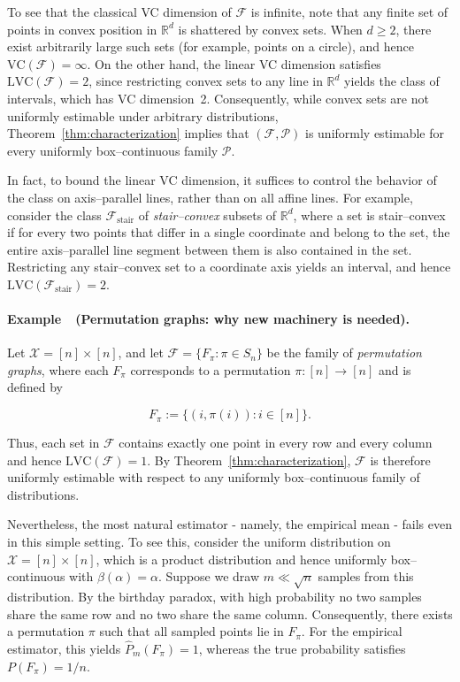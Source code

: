 \documentclass[arxiv]{colt2026}
\newcounter{examplectr}
\newcommand{\X}{\mathcal{X}}
\newcommand{\F}{\mathcal{F}}
\newcommand{\Pc}{\mathcal{P}}
\newcommand{\VC}{\mathrm{VC}}
\newcommand{\LVC}{\mathrm{LVC}}
\begin{document}
\vspace{-0.3em}
To see that the classical VC dimension of $\F$ is infinite, note that any finite set of points in convex position in $\mathbb{R}^d$ is shattered by convex sets.
When $d \ge 2$, there exist arbitrarily large such sets (for example, points on a circle), and hence $\VC(\F)=\infty$.
On the other hand, the linear VC dimension satisfies $\LVC(\F)=2$, since restricting convex sets to any line in $\mathbb{R}^d$ yields the class of intervals, which has VC dimension~2.
Consequently, while convex sets are not uniformly estimable under arbitrary distributions, Theorem~\ref{thm:characterization} implies that $(\F,\Pc)$ is uniformly estimable for every uniformly box--continuous family $\Pc$.

In fact, to bound the linear VC dimension, it suffices to control the behavior of the class on axis--parallel lines, rather than on all affine lines.
For example, consider the class $\F_{\mathrm{stair}}$ of \emph{stair--convex} subsets of $\mathbb{R}^d$, where a set is stair--convex if for every two points that differ in a single coordinate and belong to the set, the entire axis--parallel line segment between them is also contained in the set.
Restricting any stair--convex set to a coordinate axis yields an interval, and hence $\LVC(\F_{\mathrm{stair}})=2$.

\vspace{-0.4em}
\paragraph{Example~\theexamplectr\ (Permutation graphs: why new machinery is needed).}
\label{ex:perm-comparison}
Let $\X=[n]\times[n]$, and let $\F=\{F_\pi : \pi\in S_n\}$ be the family of
\emph{permutation graphs}, where each $F_\pi$ corresponds to a permutation
$\pi:[n]\to[n]$ and is defined by

\vspace{-0.5em}
\[
F_\pi := \{(i,\pi(i)) : i\in[n]\}.
\]

\vspace{-0.4em}
Thus, each set in $\F$ contains exactly one point in every row and every column and hence $\LVC(\F)=1$.
By Theorem~\ref{thm:characterization}, $\F$ is therefore uniformly estimable with respect to any uniformly box--continuous family of distributions.

Nevertheless, the most natural estimator - namely, the empirical mean - fails even
in this simple setting.
To see this, consider the uniform distribution on $\X=[n]\times[n]$, which is a
product distribution and hence uniformly box--continuous with
$\beta(\alpha)=\alpha$.
Suppose we draw $m \ll \sqrt{n}$ samples from this distribution.
By the birthday paradox, with high probability no two samples share the same row
and no two share the same column.
Consequently, there exists a permutation $\pi$ such that all sampled points lie
in $F_\pi$.
For the empirical estimator, this yields $\widehat P_m(F_\pi)=1$, whereas the true
probability satisfies $P(F_\pi)=1/n$.
\end{document}
